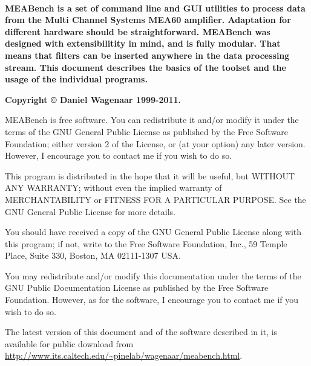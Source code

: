 \documentclass[12pt,oneside]{book}
\def\Meabench{{MEABench}\xspace}
\begin{document}
\thispagestyle{empty}
\setcounter{page}{1}

~\vspace{.5in}

\begin{center}

\vspace{10pt}


\vspace{10pt}


\vspace{1in}

\noindent\begin{minipage}{.7\textwidth}
\noindent\bf
\Meabench is a set of command line and GUI utilities to process data
from the Multi Channel Systems MEA60 amplifier.  Adaptation for
different hardware should be straightforward.  \Meabench was designed with
extensibilitity in mind, and is fully modular. That means that filters
can be inserted anywhere in the data processing stream. This document
describes the basics of the toolset and the usage of the individual
programs.
\end{minipage}

\end{center}

\vfill%
{\scriptsize\bf Copyright \copyright{} Daniel Wagenaar 1999-2011.

{\Meabench} is free software. You can redistribute it 
and/or modify it under the terms of the GNU General Public License as
published by the Free Software Foundation; either version 2 of the
License, or (at your option) any later version. However, I encourage
you to contact me if you wish to do so.

    This program is distributed in the hope that it will be useful,
    but WITHOUT ANY WARRANTY; without even the implied warranty of
    MERCHANTABILITY or FITNESS FOR A PARTICULAR PURPOSE. See the GNU
    General Public License for more details.

    You should have received a copy of the GNU General Public License
    along with this program; if not, write to the Free Software
    Foundation, Inc., 59 Temple Place, Suite 330, Boston, MA
    02111-1307 USA.

You may redistribute and/or modify this documentation under the terms
of the GNU Public Documentation License as published by the Free
Software Foundation. However, as for the software, I encourage you to
contact me if you wish to do so.

The latest version of this document and of the software described in
it, is available for public download from
 \url{http://www.its.caltech.edu/~pinelab/wagenaar/meabench.html}.
}
\end{document}
